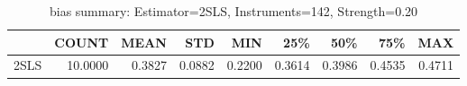 \begin{table}[ht]
\centering
\caption{bias summary: Estimator=2SLS, Instruments=142, Strength=0.20}
\begin{tabular}{lrrrrrrrr}
\toprule
 & COUNT & MEAN & STD & MIN & 25\% & 50\% & 75\% & MAX \\
\midrule
2SLS & 10.0000 & 0.3827 & 0.0882 & 0.2200 & 0.3614 & 0.3986 & 0.4535 & 0.4711 \\
\bottomrule
\end{tabular}
\end{table}
